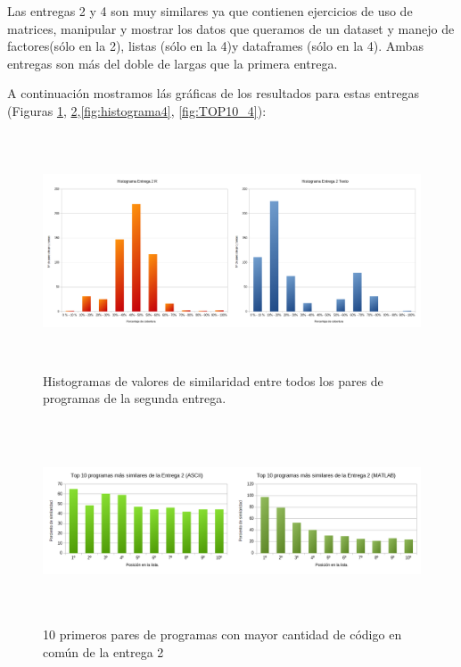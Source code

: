 \bigskip
\bigskip


Las entregas 2 y 4 son muy similares ya que contienen ejercicios de uso de matrices, manipular y mostrar los datos que queramos de un dataset y manejo de factores(sólo en la 2), listas (sólo en la 4)y dataframes (sólo en la 4).
\newline
Ambas entregas son más del doble de largas que la primera entrega.
\newline

A continuación mostramos lás gráficas de los resultados para estas entregas (Figuras \ref{fig:histograma2}, \ref{fig:TOP10_2},\ref{fig:histograma4}, \ref{fig:TOP10_4}):

\begin{figure}[H] %
\centering
\includegraphics[width=15cm, height=7cm]{imagenes/histograma2.png}  %
\caption{Histogramas de valores de similaridad entre todos los pares de programas de la segunda entrega.} \label{fig:histograma2}
\end{figure}


\begin{figure}[H] %
\centering
\includegraphics[width=14cm, height=6cm]{imagenes/TOP10_2.png}  %
\caption{10 primeros pares de programas con mayor cantidad de código en común de la entrega 2} \label{fig:TOP10_2}
\end{figure}




